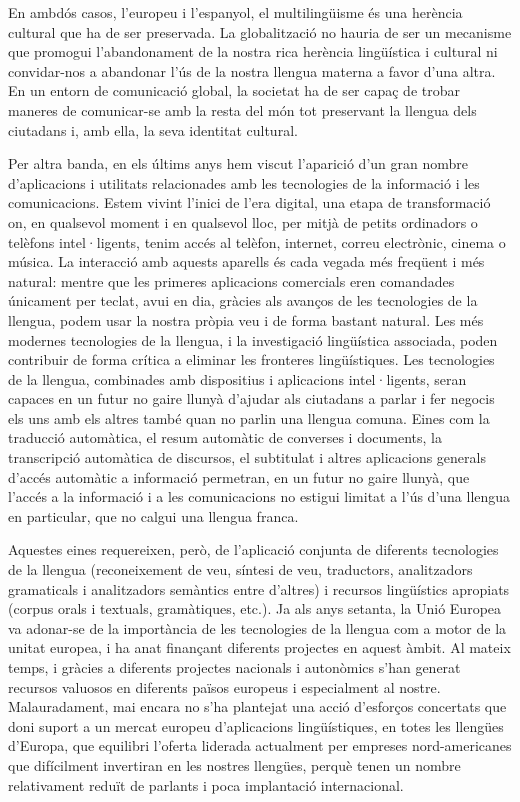 \begin{multicols}{2}

En ambdós casos, l’europeu i l’espanyol, el multilingüisme és una herència cultural que ha de ser preservada. La globalització no hauria de ser un mecanisme que promogui l’abandonament de la nostra rica herència lingüística i cultural ni convidar-nos a abandonar l’ús de la nostra llengua materna a favor d’una altra. En un entorn de comunicació global, la societat ha de ser capaç de trobar maneres de comunicar-se amb la resta del món tot preservant la llengua dels ciutadans i, amb ella, la seva identitat cultural. 
\columnbreak

Per altra banda, en els últims anys hem viscut l'aparició d'un gran nombre d'aplicacions i utilitats relacionades amb les tecnologies de la informació i les comunicacions. Estem vivint l’inici de l'era digital, una etapa de transformació on, en qualsevol moment i en qualsevol lloc, per mitjà de petits ordinadors o telèfons intel·ligents, tenim accés al telèfon, internet, correu electrònic, cinema o música. La interacció amb aquests aparells és cada vegada més freqüent i més natural: mentre que les primeres aplicacions comercials eren comandades únicament per teclat, avui en dia, gràcies als avanços de les tecnologies de la llengua, podem usar la nostra pròpia veu i de forma bastant natural. Les més modernes tecnologies de la llengua, i la investigació lingüística associada, poden contribuir de forma crítica a eliminar les fronteres lingüístiques. Les tecnologies de la llengua, combinades amb dispositius i aplicacions intel·ligents, seran capaces en un futur no gaire llunyà d’ajudar als ciutadans a parlar i fer negocis els uns amb els altres també quan no parlin una llengua comuna. Eines com la traducció automàtica, el resum automàtic de converses i documents, la transcripció automàtica de discursos, el subtitulat i altres aplicacions generals d'accés automàtic a informació permetran, en un futur no gaire llunyà, que l'accés a la informació i a les comunicacions no estigui limitat a l'ús d'una llengua en particular, que no calgui una llengua franca.

Aquestes eines requereixen, però, de l'aplicació conjunta de diferents tecnologies de la llengua (reconeixement de veu, síntesi de veu, traductors, analitzadors gramaticals i analitzadors semàntics entre d'altres) i recursos lingüístics apropiats (corpus orals i textuals, gramàtiques, etc.). Ja als anys setanta, la Unió Europea va adonar-se de la importància de les tecnologies de la llengua com a motor de la unitat europea, i ha anat finançant diferents projectes en aquest àmbit. Al mateix temps, i gràcies a diferents projectes nacionals i autonòmics s’han generat recursos valuosos en diferents països europeus i especialment al nostre. Malauradament, mai encara no s’ha plantejat una acció d’esforços concertats que doni suport a un mercat europeu d’aplicacions lingüístiques, en totes les llengües d’Europa, que equilibri l’oferta liderada actualment per empreses nord-americanes que difícilment invertiran en les nostres llengües, perquè tenen un nombre relativament reduït de parlants i poca implantació internacional. 


\end{multicols}
